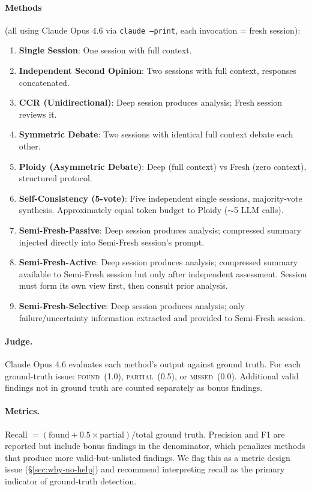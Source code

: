 \documentclass[11pt]{article}
\begin{document}
\paragraph{Methods} (all using Claude Opus 4.6 via \texttt{claude --print}, each invocation = fresh session):
\begin{enumerate}[label=\arabic*., leftmargin=1.5em]
  \item \textbf{Single Session}: One session with full context.
  \item \textbf{Independent Second Opinion}: Two sessions with full context, responses concatenated.
  \item \textbf{CCR (Unidirectional)}: Deep session produces analysis; Fresh session reviews it.
  \item \textbf{Symmetric Debate}: Two sessions with identical full context debate each other.
  \item \textbf{Ploidy (Asymmetric Debate)}: Deep (full context) vs Fresh (zero context), structured protocol.
  \item \textbf{Self-Consistency (5-vote)}: Five independent single sessions, majority-vote synthesis. Approximately equal token budget to Ploidy ($\sim$5 LLM calls).
  \item \textbf{Semi-Fresh-Passive}: Deep session produces analysis; compressed summary injected directly into Semi-Fresh session's prompt.
  \item \textbf{Semi-Fresh-Active}: Deep session produces analysis; compressed summary available to Semi-Fresh session but only after independent assessment. Session must form its own view first, then consult prior analysis.
  \item \textbf{Semi-Fresh-Selective}: Deep session produces analysis; only failure/uncertainty information extracted and provided to Semi-Fresh session.
\end{enumerate}

\paragraph{Judge.} Claude Opus 4.6 evaluates each method's output against ground truth. For each ground-truth issue: \textsc{found}~(1.0), \textsc{partial}~(0.5), or \textsc{missed}~(0.0). Additional valid findings not in ground truth are counted separately as bonus findings.

\paragraph{Metrics.} Recall $= (\text{found} + 0.5 \times \text{partial}) / \text{total ground truth}$. Precision and F1 are reported but include bonus findings in the denominator, which penalizes methods that produce more valid-but-unlisted findings. We flag this as a metric design issue (\S\ref{sec:why-no-help}) and recommend interpreting recall as the primary indicator of ground-truth detection.
\end{document}
